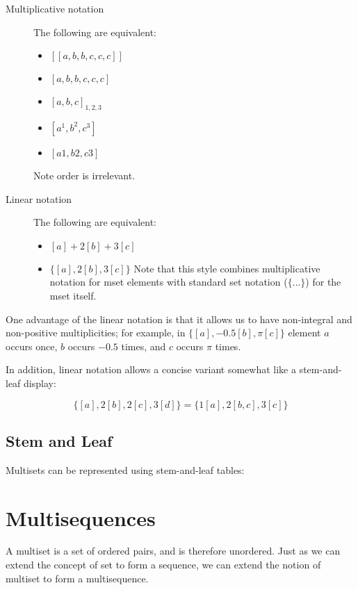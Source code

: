 \documentclass[reqno,12pt]{tufte-book}
\numberwithin{equation}{subsection}
\begin{document}
\begin{description}
\item [Multiplicative notation]  The following are equivalent:

\begin{itemize}
\item $[[a,b,b,c,c,c]]$
\item $[a,b,b,c,c,c]$
\item $[a,b,c]_{1,2,3}$
\item $[a^1,b^2,c^3]$
\item $[a1,b2,c3]$
\end{itemize}

Note order is irrelevant.

\item [Linear notation]  The following are equivalent:

\begin{itemize}
\item $[a]+2[b]+3[c]$
\item $\{[a],2[b],3[c]\}$ Note that this style combines multiplicative
  notation for mset elements with standard set notation ($\{\ldots\}$)
  for the mset itself.
\end{itemize}
\end{description}

One advantage of the linear notation is that it allows us to have
non-integral and non-positive multiplicities; for example, in
$\{[a],-0.5[b],\pi[c]\}$ element $a$ occurs once, $b$ occurs $-0.5$
times, and $c$ occurs $\pi$ times.

In addition, linear notation allows a concise variant somewhat like a
stem-and-leaf display:

$$\{[a],2[b],2[c],3[d]\} = \{1[a], 2[b,c], 3[c]\}$$

\subsection{Stem and Leaf}

Multisets can be represented using stem-and-leaf tables:

\section{Multisequences}

A multiset is a set of ordered pairs, and is therefore unordered.
Just as we can extend the concept of set to form a sequence, we can
extend the notion of multiset to form a multisequence.
\end{document}
